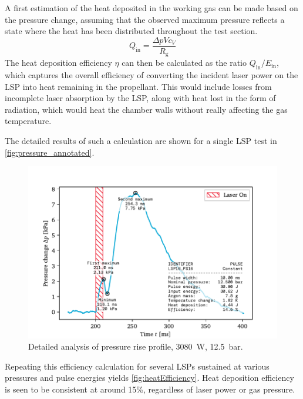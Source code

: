             A first estimation of the heat deposited in the working gas can be made based on the pressure change, assuming that the observed maximum pressure reflects a state where the heat has been distributed throughout the test section. 
            \begin{equation} \label{eq:heatdep}
                Q_\mathrm{in} = \frac{\Delta pVc_V}{R_\mathrm{g}}
            \end{equation}
            The heat deposition efficiency $\eta$ can then be calculated as the ratio $Q_\mathrm{in}/E_\mathrm{in}$, which captures the overall efficiency of converting the incident laser power on the LSP into heat remaining in the propellant. This would include losses from incomplete laser absorption by the LSP, along with heat lost in the form of radiation, which would heat the chamber walls without really affecting the gas temperature.

            The detailed results of such a calculation are shown for a single LSP test in \autoref{fig:pressure_annotated}.

            \begin{figure}[h]
                \centering
                \includegraphics[]{assets/5 results/pressure_an_LSP16_PS16}
                \caption[Detailed analysis of pressure rise profile]{Detailed analysis of pressure rise profile, \qty{3080}{W}, \qty{12.5}{bar}.}
                \label{fig:pressure_annotated}
            \end{figure}


            Repeating this efficiency calculation for several LSPs sustained at various pressures and pulse energies yields \autoref{fig:heatEfficiency}. Heat deposition efficiency is seen to be consistent at around 15\%, regardless of laser power or gas pressure. 


